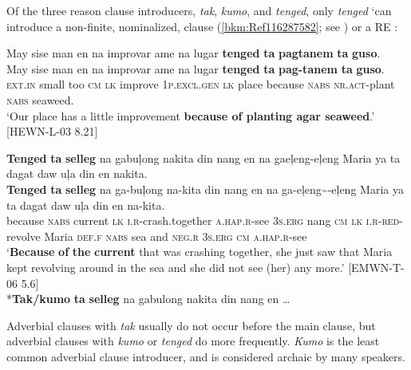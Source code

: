 Of the three reason clause introducers, \textit{tak}, \textit{kumo}, and \textit{tenged}, only \textit{tenged} ‘can introduce a non-finite, nominalized, clause (\ref{bkm:Ref116287582}; see ) or a RE :

\ea
\label{bkm:Ref116287582}
May  sise  man  en  na  improvar  ame  na  lugar \textbf{tenged}  \textbf{ta}  \textbf{pagtanem}  \textbf{ta}  \textbf{guso}.\smallskip\\
\gll May  sise  man  en  na  improvar  ame  na  lugar \textbf{tenged}  \textbf{ta}  \textbf{pag-tanem}  \textbf{ta}  \textbf{guso}. \\
\textsc{ext.in}  small  too  \textsc{cm}  \textsc{lk}  improve  1\textsc{p.excl.gen}  \textsc{lk}  place
because  \textsc{nabs}  \textsc{nr.act}-plant  \textsc{nabs}  seaweed. \\
\glt `Our place has a little improvement \textbf{because of planting agar seaweed}.’  [HEWN-L-03 8.21]
\z

\newpage
\ea
\label{bkm:Ref116287610}
\textbf{Tenged}  \textbf{ta}  \textbf{selleg}  na  gabuļong  nakita  din  nang  en na  gaeļeng-eļeng  Maria  ya  ta  dagat  daw  uļa  din  en  nakita. \smallskip\\
\gll \textbf{Tenged}  \textbf{ta}  \textbf{selleg}  na  ga-buļong  na-kita  din  nang  en na  ga-eļeng\sim{}-eļeng  Maria  ya  ta  dagat  daw  uļa  din  en  na-kita. \\
because  \textsc{nabs}  current  \textsc{lk}  \textsc{i.r}-crash.together  \textsc{a.hap.r}-see  3\textsc{s.erg}  nang  \textsc{cm}
\textsc{lk}  \textsc{i.r}-\textsc{red}-revolve  Maria  \textsc{def.f}  \textsc{nabs}  sea  and  \textsc{neg.r}  3\textsc{s.erg}  \textsc{cm}  \textsc{a.hap.r}-see \\
\glt `\textbf{Because} \textbf{of} \textbf{the} \textbf{current} that was crashing together, she just saw that Maria kept revolving around in the sea and she did not see (her) any more.’ [EMWN-T-06 5.6] \smallskip\\
*\textbf{Tak/kumo} \textbf{ta} \textbf{selleg} na gabulong nakita din nang en …
\z

Adverbial clauses with \textit{tak} usually do not occur before the main clause, but adverbial clauses with \textit{kumo} or \textit{tenged} do more frequently. \textit{Kumo} is the least common adverbial clause introducer, and is considered archaic by many speakers.

